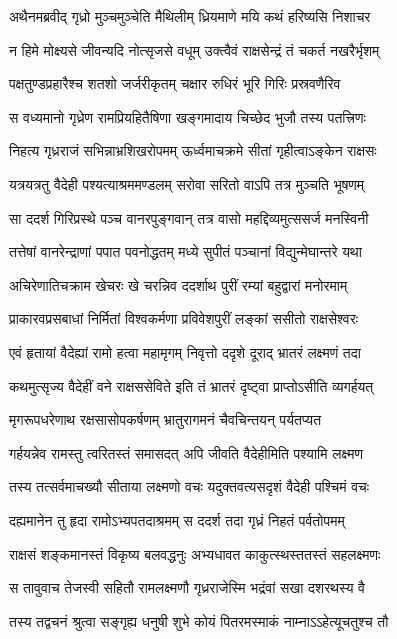 \twolineshloka
{अथैनमब्रवीद् गृध्रो मुञ्चमुञ्चेति मैथिलीम्}
{ध्रियमाणे मयि कथं हरिष्यसि निशाचर}


\twolineshloka
{न हिमे मोक्ष्यसे जीवन्यदि नोत्सृजसे वधूम्}
{उक्त्वैवं राक्षसेन्द्रं तं चकर्त नखरैर्भृशम्}


\twolineshloka
{पक्षतुण्डप्रहारैश्च शतशो जर्जरीकृतम्}
{चक्षार रुधिरं भूरि गिरिः प्रस्रवणैरिव}


\twolineshloka
{स वध्यमानो गृध्रेण रामप्रियहितैषिणा}
{खङ्गमादाय चिच्छेद भुजौ तस्य पतत्त्रिणः}


\twolineshloka
{निहत्य गृध्रराजं सभिन्नाभ्रशिखरोपमम्}
{ऊर्ध्वमाचक्रमे सीतां गृहीत्वाऽङ्केन राक्षसः}


\twolineshloka
{यत्रयत्रतु वैदेही पश्यत्याश्रममण्डलम्}
{सरोवा सरितो वाऽपि तत्र मुञ्चति भूषणम्}


\twolineshloka
{सा ददर्श गिरिप्रस्थे पञ्च वानरपुङ्गवान्}
{तत्र वासो महद्दिव्यमुत्ससर्ज मनस्विनी}


\twolineshloka
{तत्तेषां वानरेन्द्राणां पपात पवनोद्धतम्}
{मध्ये सुपीतं पञ्चानां विद्युन्मेघान्तरे यथा}


\twolineshloka
{अचिरेणातिचक्राम खेचरः खे चरन्निव}
{ददर्शाथ पुरीं रम्यां बहुद्वारां मनोरमाम्}


\twolineshloka
{प्राकारवप्रसबाधां निर्मितां विश्वकर्मणा}
{प्रविवेशपुरीं लङ्कां ससीतो राक्षसेश्वरः}


\twolineshloka
{एवं हृतायां वैदेह्यां रामो हत्वा महामृगम्}
{निवृत्तो ददृशे दूराद् भ्रातरं लक्ष्मणं तदा}


\twolineshloka
{कथमुत्सृज्य वैदेहीं वने राक्षससेविते}
{इति तं भ्रातरं दृष्ट्वा प्राप्तोऽसीति व्यगर्हयत्}


\twolineshloka
{मृगरूपधरेणाथ रक्षसासोपकर्षणम्}
{भ्रातुरागमनं चैवचिन्तयन् पर्यतप्यत}


\twolineshloka
{गर्हयन्नेव रामस्तु त्वरितस्तं समासदत्}
{अपि जीवति वैदेहीमिति पश्यामि लक्ष्मण}


\twolineshloka
{तस्य तत्सर्वमाचख्यौ सीताया लक्ष्मणो वचः}
{यदुक्तवत्यसदृशं वैदेही पश्चिमं वचः}


\twolineshloka
{दह्यमानेन तु हृदा रामोऽभ्यपतदाश्रमम्}
{स ददर्श तदा गृध्रं निहतं पर्वतोपमम्}


\twolineshloka
{राक्षसं शङ्कमानस्तं विकृष्य बलवद्धनुः}
{अभ्यधावत काकुत्स्थस्ततस्तं सहलक्ष्मणः}


\twolineshloka
{स तावुवाच तेजस्वी सहितौ रामलक्ष्मणौ}
{गृध्रराजेस्मि भद्रंवां सखा दशरथस्य वै}


\twolineshloka
{तस्य तद्वचनं श्रुत्वा सङ्गृह्य धनुषी शुभे}
{कोयं पितरमस्माकं नाम्नाऽऽहेत्यूचतुश्च तौ}


